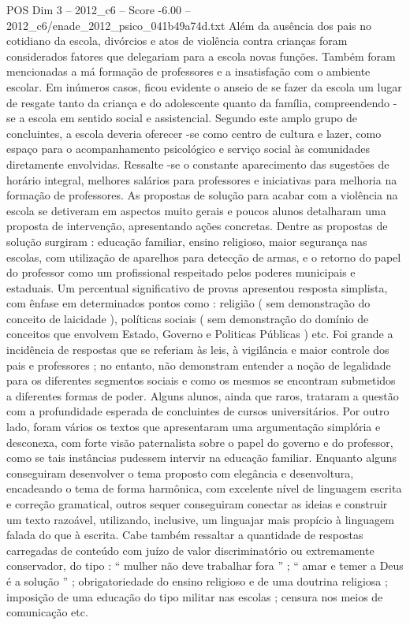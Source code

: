 \begin{textsample}{POS Dim 3 – 2012\_c6 – Score -6.00 – 2012\_c6/enade\_2012\_psico\_041b49a74d.txt}
Além da ausência dos pais no cotidiano da escola, divórcios e atos de violência contra crianças foram considerados fatores que delegariam para a escola novas funções.
Também foram mencionadas a má formação de professores e a insatisfação com o ambiente escolar.
Em inúmeros casos, ficou evidente o anseio de se fazer da escola um lugar de resgate tanto da criança e do adolescente quanto da família, compreendendo -se a escola em sentido social e assistencial.
Segundo este amplo grupo de concluintes, a escola deveria oferecer -se como centro de cultura e lazer, como espaço para o acompanhamento psicológico e serviço social às comunidades diretamente envolvidas.
Ressalte -se o constante aparecimento das sugestões de horário integral, melhores salários para professores e iniciativas para melhoria na formação de professores.
As propostas de solução para acabar com a violência na escola se detiveram em aspectos muito gerais e poucos alunos detalharam uma proposta de intervenção, apresentando ações concretas.
Dentre as propostas de solução surgiram : educação familiar, ensino religioso, maior segurança nas escolas, com utilização de aparelhos para detecção de armas, e o retorno do papel do professor como um profissional respeitado pelos poderes municipais e estaduais.
Um percentual significativo de provas apresentou resposta simplista, com ênfase em determinados pontos como : religião ( sem demonstração do conceito de laicidade ), políticas sociais ( sem demonstração do domínio de conceitos que envolvem Estado, Governo e Politicas Públicas ) etc.
Foi grande a incidência de respostas que se referiam às leis, à vigilância e maior controle dos pais e professores ; no entanto, não demonstram entender a noção de legalidade para os diferentes segmentos sociais e como os mesmos se encontram submetidos a diferentes formas de poder.
Alguns alunos, ainda que raros, trataram a questão com a profundidade esperada de concluintes de cursos universitários.
Por outro lado, foram vários os textos que apresentaram uma argumentação simplória e desconexa, com forte visão paternalista sobre o papel do governo e do professor, como se tais instâncias pudessem intervir na educação familiar.
Enquanto alguns conseguiram desenvolver o tema proposto com elegância e desenvoltura, encadeando o tema de forma harmônica, com excelente nível de linguagem escrita e correção gramatical, outros sequer conseguiram conectar as ideias e construir um texto razoável, utilizando, inclusive, um linguajar mais propício à linguagem falada do que à escrita.
Cabe também ressaltar a quantidade de respostas carregadas de conteúdo com juízo de valor discriminatório ou extremamente conservador, do tipo : “ mulher não deve trabalhar fora ” ; “ amar e temer a Deus é a solução ” ; obrigatoriedade do ensino religioso e de uma doutrina religiosa ; imposição de uma educação do tipo militar nas escolas ; censura nos meios de comunicação etc.

\end{textsample}

